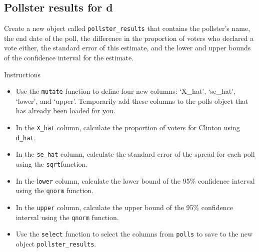 \documentclass[]{article}
\newenvironment{Shaded}{\begin{snugshade}}{\end{snugshade}}
\newcommand{\KeywordTok}[1]{\textcolor[rgb]{0.13,0.29,0.53}{\textbf{#1}}}
\newcommand{\FloatTok}[1]{\textcolor[rgb]{0.00,0.00,0.81}{#1}}
\newcommand{\StringTok}[1]{\textcolor[rgb]{0.31,0.60,0.02}{#1}}
\newcommand{\CommentTok}[1]{\textcolor[rgb]{0.56,0.35,0.01}{\textit{#1}}}
\newcommand{\OperatorTok}[1]{\textcolor[rgb]{0.81,0.36,0.00}{\textbf{#1}}}
\newcommand{\NormalTok}[1]{#1}
\providecommand{\tightlist}{%
  \setlength{\itemsep}{0pt}\setlength{\parskip}{0pt}}
\begin{document}
\begin{Shaded}
\end{Shaded}

\subsection{\texorpdfstring{\textbf{Pollster results for
d}}{Pollster results for d}}\label{pollster-results-for-d}

Create a new object called \texttt{pollster\_results} that contains the
pollster's name, the end date of the poll, the difference in the
proportion of voters who declared a vote either, the standard error of
this estimate, and the lower and upper bounds of the confidence interval
for the estimate.

Instructions

\begin{itemize}
\tightlist
\item
  Use the \texttt{mutate} function to define four new columns: `X\_hat',
  `se\_hat', `lower', and `upper'. Temporarily add these columns to the
  polls object that has already been loaded for you.
\item
  In the \texttt{X\_hat} column, calculate the proportion of voters for
  Clinton using \texttt{d\_hat}.
\item
  In the \texttt{se\_hat} column, calculate the standard error of the
  spread for each poll using the \texttt{sqrt}function.
\item
  In the l\texttt{ower} column, calculate the lower bound of the 95\%
  confidence interval using the \texttt{qnorm} function.
\item
  In the \texttt{upper} column, calculate the upper bound of the 95\%
  confidence interval using the \texttt{qnorm} function.
\item
  Use the \texttt{select} function to select the columns from
  \texttt{polls} to save to the new object \texttt{pollster\_results}.
\end{itemize}
\end{document}
